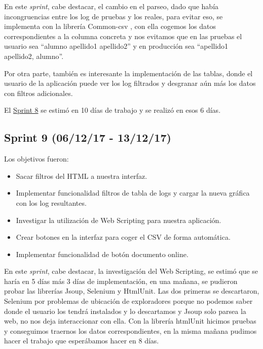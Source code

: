 En este \emph{sprint}, cabe destacar, el cambio en el parseo, dado que había incongruencias entre los log de pruebas y los reales, para evitar eso, se implementa con la librería Common-csv \cite{Java:csv}, con ella cogemos los datos correspondientes a la columna concreta y nos evitamos que en las pruebas el usuario sea ``alumno apellido1 apellido2'' y en producción sea ``apellido1 apellido2, alumno''.

Por otra parte, también es interesante la implementación de las tablas, donde el usuario de la aplicación puede ver los log filtrados y desgranar aún más los datos con filtros adicionales.

El \href{https://github.com/trona85/GII-17.1B-UBULog-1.0/milestone/8?closed=1}{Sprint 8} se estimó en 10 días de trabajo y se realizó en esos 6 días.

\newpage
\subsection{Sprint 9 (06/12/17 -
	13/12/17)}\label{sprint-9-061217---131217}

Los objetivos fueron:
\begin{itemize}
	\tightlist
	\item
	Sacar filtros del HTML a nuestra interfaz.
	\item
	Implementar funcionalidad filtros de tabla de logs y cargar la nueva gráfica con los log resultantes.
	\item
	Investigar la utilización de Web Scripting para nuestra aplicación.
	\item
	Crear botones en la interfaz para coger el CSV de forma automática.
	\item
	Implementar funcionalidad de botón documento online.
	
\end{itemize}

En este \emph{sprint}, cabe destacar, la investigación del Web Scripting, se estimó que se haría en 5 días más 3 días de implementación, en una mañana, se pudieron probar las librerías Jsoup, Selenium y HtmlUnit. Las dos primeras se descartaron, Selenium por problemas de ubicación de exploradores porque no podemos saber donde el usuario los tendrá instalados y lo descartamos y Jsoup solo parsea la web, no nos deja interaccionar con ella. Con la librería htmlUnit hicimos pruebas y conseguimos traernos los datos correspondientes, en la misma mañana pudimos hacer el trabajo que esperábamos hacer en 8 días.

